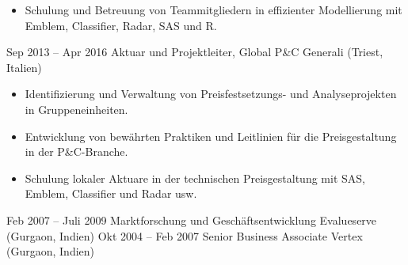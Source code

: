 \documentclass[a4paper,]{fortysecondscv}
\begin{document}
\begin{cvtable}
{\begin{itemize}[nosep, leftmargin=0pt]
            \item Schulung und Betreuung von Teammitgliedern in effizienter Modellierung mit Emblem, Classifier, Radar, SAS und R.
        \end{itemize}
    }
    \vspace{\topsep}
    \cvitem
    {Sep 2013 -- Apr 2016}
    {Aktuar und Projektleiter, Global P\&C}
    {Generali (Triest, Italien)}
    {
        \vspace{-\topsep}
        \begin{itemize}[nosep, leftmargin=0pt] %
            \item Identifizierung und Verwaltung von Preisfestsetzungs- und Analyseprojekten in Gruppeneinheiten.
            \item Entwicklung von bewährten Praktiken und Leitlinien für die Preisgestaltung in der P\&C-Branche.
            \item Schulung lokaler Aktuare in der technischen Preisgestaltung mit SAS, Emblem, Classifier und Radar usw.
        \end{itemize}
    }
    \vspace{\topsep}
    \cvitem
    {Feb 2007 -- Juli 2009}
    {Marktforschung und Geschäftsentwicklung}
    {Evalueserve (Gurgaon, Indien)}
    {
    }
    \vspace{\topsep}
    \cvitem
    {Okt 2004 -- Feb 2007}
    {Senior Business Associate}
    {Vertex (Gurgaon, Indien)}
    {
    }
\end{cvtable}

\end{document}
